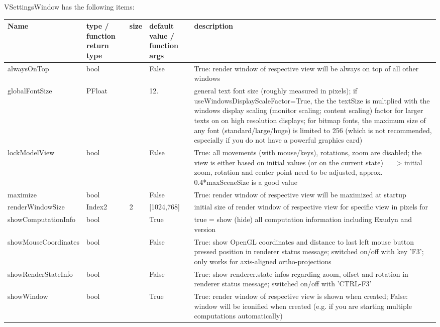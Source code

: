 \noindent VSettingsWindow has the following items:
\begin{center}
  \footnotesize
  \begin{longtable}{| p{4.2cm} | p{2.5cm} | p{0.3cm} | p{3.0cm} | p{6cm} |}
    \hline
    \bf Name & \bf type / function return type & \bf size & \bf default value / function args & \bf description \\ \hline
    alwaysOnTop &     bool &      &     False &     True: render window of respective view will be always on top of all other windows\\ \hline
    globalFontSize &     PFloat &      &     12. &     general text font size (roughly measured in pixels); if useWindowsDisplayScaleFactor=True, the the textSize is multplied with the windows display scaling (monitor scaling; content scaling) factor for larger texts on on high resolution displays; for bitmap fonts, the maximum size of any font (standard/large/huge) is limited to 256 (which is not recommended, especially if you do not have a powerful graphics card)\\ \hline
    lockModelView &     bool &      &     False &     True: all movements (with mouse/keys), rotations, zoom are disabled; the view is either based on initial values (or on the current state) ==> initial zoom, rotation and center point need to be adjusted, approx. 0.4*maxSceneSize is a good value\\ \hline
    maximize &     bool &      &     False &     True: render window of respective view will be maximized at startup\\ \hline
    renderWindowSize &     Index2 &     2 &     [1024,768] &     initial size of render window of respective view for specific view in pixels for\\ \hline
    showComputationInfo &     bool &      &     True &     true = show (hide) all computation information including Exudyn and version\\ \hline
    showMouseCoordinates &     bool &      &     False &     True: show OpenGL coordinates and distance to last left mouse button pressed position in renderer status message; switched on/off with key 'F3'; only works for axis-aligned ortho-projections\\ \hline
    showRenderStateInfo &     bool &      &     False &     True: show renderer.state infos regarding zoom, offset and rotation in renderer status message; switched on/off with 'CTRL-F3'\\ \hline
    showWindow &     bool &      &     True &     True: render window of respective view is shown when created; False: window will be iconified when created (e.g. if you are starting multiple computations automatically)\\ \hline
	  \end{longtable}
	\end{center}


